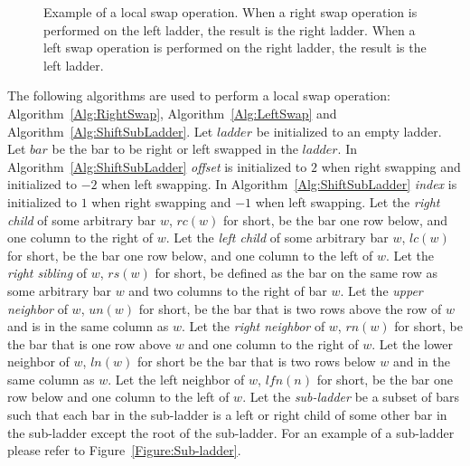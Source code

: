\begin{figure}[h]
\begin{minipage}{0.4\textwidth}
\begin{flushright}
		\end{flushright}
	\end{minipage}
	\caption{Example of a local swap operation. When a right swap operation is performed
	on the left ladder, the result is the right ladder. When a left swap operation is performed
	on the right ladder, the result is the left ladder.}
	\label{fig:rightSwap}
\end{figure}


The following algorithms are used to perform a local swap operation: Algorithm~\ref{Alg:RightSwap}, Algorithm~\ref{Alg:LeftSwap} and Algorithm~\ref{Alg:ShiftSubLadder}.
Let $ladder$ be initialized to an empty ladder. Let $bar$ be the bar to be right or left swapped in the $ladder$.
In Algorithm~\ref{Alg:ShiftSubLadder} \textit{offset} is initialized to $2$ when right swapping and initialized to 
$-2$ when left swapping. In Algorithm~\ref{Alg:ShiftSubLadder} \textit{index} is initialized to $1$ when 
right swapping and $-1$ when left swapping.
Let the \emph{right child} of some arbitrary bar $w$, $rc(w)$ for short, be the bar one row below, and one column to the 
right of $w$. Let the \emph{left child} of some arbitrary bar $w$, $lc(w)$ for short, be the bar one 
row below, and one column to the left of $w$. 
Let the \emph{right sibling} of $w$, $rs(w)$ for short,  be defined as the bar on the same row as some arbitrary bar $w$ and
two columns to the right of bar $w$. 
Let the \emph{upper neighbor} of $w$, $un(w)$ for short, be the bar that is two rows above the row of $w$ and is 
in the same column as $w$. Let the \emph{right neighbor} of $w$, $rn(w)$ for short, be the bar that is one row 
above $w$ and one column to the right of $w$. Let the lower neighbor of $w$, $ln(w)$ for short be 
the bar that is two rows below $w$ and in the same column as $w$. Let the left neighbor of 
$w$, $lfn(n)$ for short, be the bar one row below and one column to the left of $w$.
Let the \emph{sub-ladder} be a subset of bars such that each bar in the sub-ladder is a left or right child 
of some other bar in the sub-ladder except the root of the sub-ladder. For an example of a sub-ladder please refer to 
Figure~\ref{Figure:Sub-ladder}.
